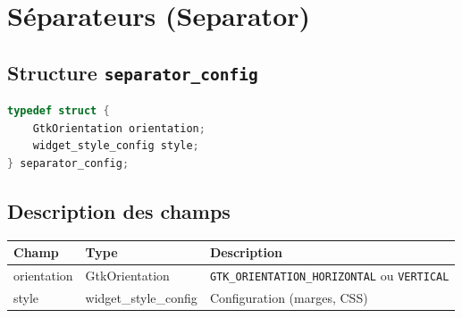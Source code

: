 \section{Séparateurs (Separator)}

\subsection{Structure \texttt{separator\_config}}
\begin{lstlisting}[language=C]
typedef struct {
    GtkOrientation orientation;
    widget_style_config style;
} separator_config;
\end{lstlisting}

\subsection{Description des champs}
\begin{center}
\begin{tabular}{|l|l|>{\raggedright\arraybackslash}p{6cm}|}
\hline
\textbf{Champ} & \textbf{Type} & \textbf{Description} \\
\hline
orientation & GtkOrientation & \texttt{GTK\_ORIENTATION\_HORIZONTAL} ou \texttt{VERTICAL} \\
\hline
style & widget\_style\_config & Configuration (marges, CSS) \\
\hline
\end{tabular}
\end{center}